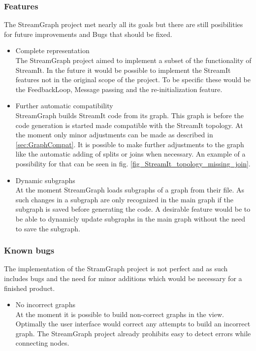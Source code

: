 \documentclass[journal]{IEEEtran}
\begin{document}
\subsubsection{Features}
The StreamGraph project met nearly all its goals but there are still 
posibilities for future improvements and Bugs that should be fixed.
\begin{itemize}

\item Complete representation\\
The StreamGraph project aimed to implement a subset of the functionality 
of StreamIt. In the future it would be possible to implement the StreamIt 
features not in the original scope of the project. To be specific these 
would be the FeedbackLoop, Message passing and the re-initialization feature.\\

\item Further automatic compatibility\\
StreamGraph builds StreamIt code from its graph. This graph is before the 
code generation is started made compatible with the StreamIt topology. At 
the moment only minor adjustments can be made as described in 
\ref{sec:GraphCompat}. It is possible to make further adjustments to the 
graph like the automatic adding of splits or joins when necessary. An 
example of a possibility for that can be seen in fig. 
\ref{fig_StreamIt_topology_missing_join}.

\item Dynamic subgraphs\\
At the moment StreamGraph loads subgraphs of a graph from their file. As such 
changes in a subgraph are only recognized in the main graph if the subgraph 
is saved before generating the code. A desirable feature would be to be able 
to dynamicly update subgraphs in the main graph without the need to save the 
subgraph.
\end{itemize}

\subsubsection{Known bugs}
The implementation of the StramGraph project is not perfect and as such includes
bugs and the need for minor additions which would be necessary for a finished product.
\begin{itemize}

\item No incorrect graphs\\
At the moment it is possible to build non-correct graphs in the view. Optimally the 
user interface would correct any attempts to build an incorrect graph. The StreamGraph 
project already prohibits easy to detect errors while connecting nodes.

\end{itemize}
\end{document}
